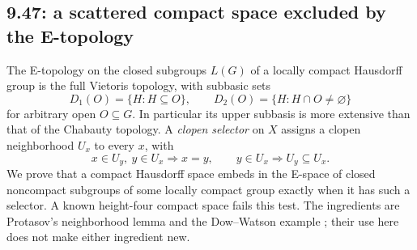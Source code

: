 \subsection{9.47: a scattered compact space excluded by the E-topology}
\label{cand:9.47}
The E-topology on the closed subgroups \(L(G)\) of a locally compact
Hausdorff group is the full Vietoris topology, with subbasic sets
\[
 D_1(O)=\{H:H\subseteq O\},\qquad D_2(O)=\{H:H\cap O\ne\varnothing\}
\]
for arbitrary open \(O\subseteq G\). In particular its upper subbasis
is more extensive than that of the Chabauty topology.
A \emph{clopen selector} on \(X\) assigns a clopen neighborhood \(U_x\)
to every \(x\), with
\[
 x\in U_y,\ y\in U_x\Longrightarrow x=y,\qquad
 y\in U_x\Longrightarrow U_y\subseteq U_x.
\]
We prove that a compact Hausdorff space embeds in the E-space of closed
noncompact subgroups of some locally compact group exactly when it
has such a selector. A known height-four compact space fails this test.
The ingredients are Protasov's neighborhood lemma
\cite{protasov-compacts,komarov-protasov} and the Dow--Watson example
\cite{dow-watson}; their use here does not make either ingredient new.

